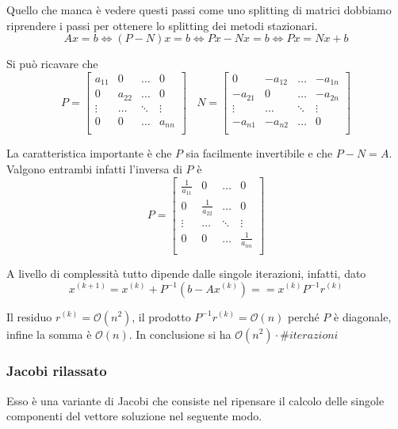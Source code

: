 Quello che manca è vedere questi passi come uno splitting di matrici dobbiamo 
riprendere i passi per ottenere lo splitting dei metodi stazionari.
$$Ax=b \iff (P-N)x=b \iff Px-Nx=b \iff Px = Nx+b$$

Si può ricavare che 
\begin{equation*}
    P= \left[\begin{array}{cccc}
        a_{11} & 0 & \dots & 0\\
        0 & a_{22} & \dots & 0\\
        \vdots & \dots & \ddots & \vdots\\
        0 & 0 & \dots & a_{nn}\\
    \end{array}\right]
    \ \ \ \
    N = \left[\begin{array}{cccc}
         0& -a_{12} & \dots & -a_{1n}\\
        -a_{21} & 0 & \dots & -a_{2n}\\
        \vdots & \dots & \ddots & \vdots\\
        -a_{n1} & -a_{n2} & \dots & 0\\
    \end{array}\right]
\end{equation*}

La caratteristica importante è che $P$ sia facilmente invertibile e che $P-N =A$.
Valgono entrambi infatti l'inversa di $P$ è
\begin{equation*}
    P= \left[\begin{array}{cccc}
        \frac{1}{a_{11}} & 0 & \dots & 0\\
        0 & \frac{1}{a_{22}} & \dots & 0\\
        \vdots & \dots & \ddots & \vdots\\
        0 & 0 & \dots & \frac{1}{a_{nn}}\\
    \end{array}\right]
\end{equation*}

A livello di complessità tutto dipende dalle singole iterazioni,
infatti, dato
$$x^{(k+1)}=x^{(k)}+P^{-1}(b-Ax^{(k)}) = =x^{(k)}P^{-1}r^{(k)}$$

Il residuo $r^{(k)} = \mathcal{O}(n^2)$, il prodotto $P^{-1}r^(k) = \mathcal{O}(n)$
perché $P$ è diagonale, infine la somma è $\mathcal{O}(n)$. In conclusione si ha 
$\mathcal{O}(n^2)\cdot \#iterazioni$
\subsubsection{Jacobi rilassato}
Esso è una variante di Jacobi che consiste nel ripensare il calcolo delle singole 
componenti del vettore soluzione nel seguente modo.

